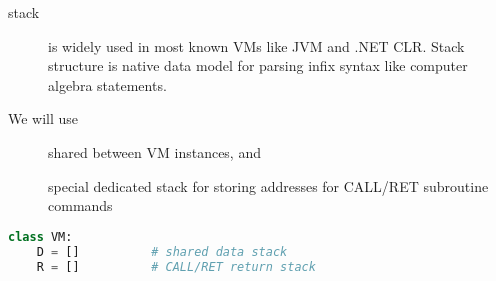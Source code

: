 \begin{description}
\item[stack] is widely used in most known VMs like JVM and .NET CLR. Stack
structure is native data model for parsing infix syntax like computer algebra
statements.
\end{description}

\noindent
We will use
\begin{description}
\item[] shared between VM instances, and
\item[] special dedicated stack for storing addresses for
CALL/RET subroutine commands
\end{description}
\begin{lstlisting}[language=python]
class VM:
	D = []			# shared data stack
	R = []			# CALL/RET return stack
\end{lstlisting}
